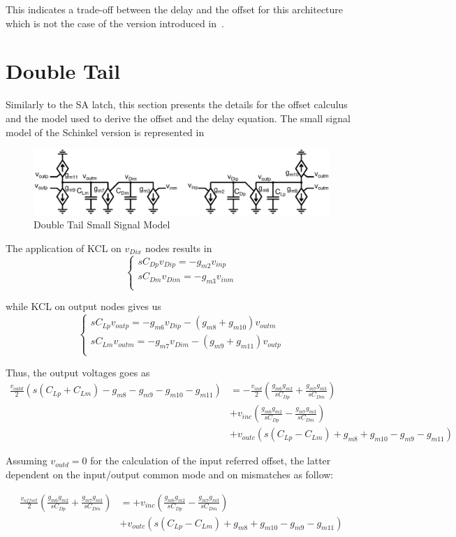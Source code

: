 This indicates a trade-off between the delay and the offset for this architecture which is not the case of the version introduced in~\cite{Verbruggen2008}.

\section{Double Tail}
Similarly to the SA latch, this section presents the details for the offset calculus and the model used to derive the offset and the delay equation. The small signal model of the Schinkel version is represented in 

\begin{figure}[htp]
    \centering
    \includegraphics[width=\textwidth]{Chapter7/Figs/dtl_small_signal_model.ps}
    \caption{Double Tail Small Signal Model}
    \label{fig:annexe_dtl_schinkel_small_signal}
\end{figure}

The application of KCL on \(v_{Dix}\) nodes results in 
\[
\begin{cases}
    sC_{Dp}v_{Dip} = -g_{m2}v_{inp} \\
    sC_{Dm}v_{Dim} = -g_{m3}v_{inm} \\
\end{cases}
\]

while KCL on output nodes gives us
\[
\begin{cases}
    sC_{Lp}v_{outp} = -g_{m6}v_{Dip}-\left(g_{m8}+g_{m10}\right)v_{outm} \\
    sC_{Lm}v_{outm} = -g_{m7}v_{Dim}-\left(g_{m9}+g_{m11}\right)v_{outp} \\
\end{cases}
\]

Thus, the output voltages goes as
\begin{align}
\frac{v_{outd}}{2} \left(s\left(C_{Lp}+C_{Lm} \right)-g_{m8}-g_{m9}-g_{m10}-g_{m11} \right) &= 
-\frac{v_{ind}}{2} \left(\frac{g_{m6}g_{m2}}{sC_{Dp}}+\frac{g_{m7}g_{m3}}{sC_{Dm}} \right) \\
&+ v_{inc} \left(\frac{g_{m6}g_{m2}}{sC_{Dp}}-\frac{g_{m7}g_{m3}}{sC_{Dm}} \right) \nonumber \\
&+ v_{outc} \left(s\left(C_{Lp}-C_{Lm} \right)+g_{m8}+g_{m10}-g_{m9}-g_{m11} \right) \nonumber
\end{align}

Assuming \(v_{outd} = 0\) for the calculation of the input referred offset, the latter dependent on the input/output common mode and on mismatches as follow:

\begin{align}
\frac{v_{offset}}{2} \left(\frac{g_{m6}g_{m2}}{sC_{Dp}}+\frac{g_{m7}g_{m3}}{sC_{Dm}} \right) &= + v_{inc} \left(\frac{g_{m6}g_{m2}}{sC_{Dp}}-\frac{g_{m7}g_{m3}}{sC_{Dm}} \right) \\
&+ v_{outc} \left(s\left(C_{Lp}-C_{Lm} \right)+g_{m8}+g_{m10}-g_{m9}-g_{m11} \right) \nonumber
\end{align}

